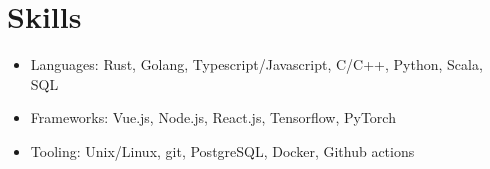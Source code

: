 \documentclass[letterpaper,11pt]{article}
\newcommand{\resumeItem}[2]{
  \item\small{#1{: #2}} \vspace{-2pt}
}
\newcommand{\resumeSubItem}[2]{\resumeItem{#1}{#2} \vspace{-2pt}}
\newcommand{\resumeListStart}{\begin{itemize}[leftmargin=*]}
\newcommand{\resumeListEnd}{\end{itemize}}
\begin{document}
\section{Skills}
  \resumeListStart
    \resumeSubItem{Languages}{Rust, Golang, Typescript/Javascript, C/C++, Python, Scala, SQL}
    \resumeSubItem{Frameworks}{Vue.js, Node.js, React.js, Tensorflow, PyTorch}
    \resumeSubItem{Tooling}{Unix/Linux, git, PostgreSQL, Docker, Github actions}
  \resumeListEnd

\end{document}
